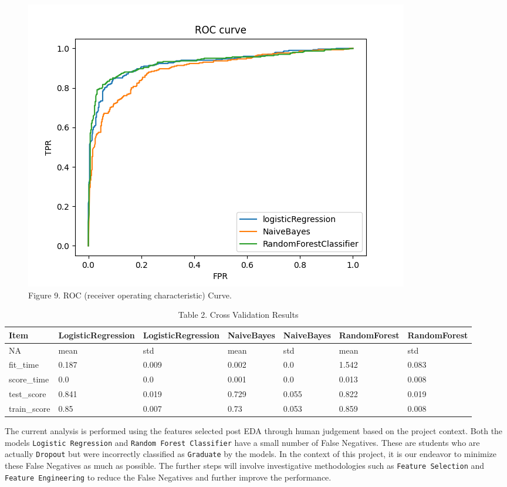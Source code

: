 \documentclass[
]{article}
\begin{document}
\begin{figure}
\includegraphics[width=1\linewidth]{../results/ROC_curve} \caption{Figure 9. ROC (receiver operating characteristic) Curve.}\label{fig:ROC_curve}
\end{figure}

\begin{table}

\caption{\label{tab:load model results}Table 2. Cross Validation Results}
\centering
\begin{tabular}[t]{l|l|l|l|l|l|l}
\hline
Item & LogisticRegression & LogisticRegression & NaiveBayes & NaiveBayes & RandomForest & RandomForest\\
\hline
NA & mean & std & mean & std & mean & std\\
\hline
fit\_time & 0.187 & 0.009 & 0.002 & 0.0 & 1.542 & 0.083\\
\hline
score\_time & 0.0 & 0.0 & 0.001 & 0.0 & 0.013 & 0.008\\
\hline
test\_score & 0.841 & 0.019 & 0.729 & 0.055 & 0.822 & 0.019\\
\hline
train\_score & 0.85 & 0.007 & 0.73 & 0.053 & 0.859 & 0.008\\
\hline
\end{tabular}
\end{table}

The current analysis is performed using the features selected post EDA
through human judgement based on the project context. Both the models
\texttt{Logistic\ Regression} and \texttt{Random\ Forest\ Classifier}
have a small number of False Negatives. These are students who are
actually \texttt{Dropout} but were incorrectly classified as
\texttt{Graduate} by the models. In the context of this project, it is
our endeavor to minimize these False Negatives as much as possible. The
further steps will involve investigative methodologies such as
\texttt{Feature\ Selection} and \texttt{Feature\ Engineering} to reduce
the False Negatives and further improve the performance.
\end{document}
